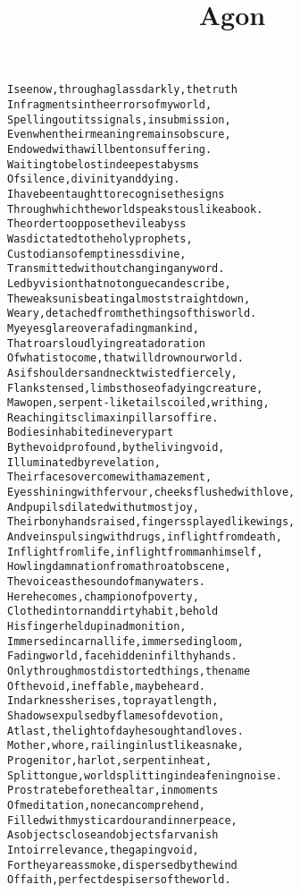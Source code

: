 \documentclass{article}
\title{Agon}
\begin{document}
\maketitle

\clearpage

\begin{alltt}\normalfont
I see now, through a glass darkly, the truth
In fragments in the errors of my world,
Spelling out its signals, in submission,
Even when their meaning remains obscure,
Endowed with a will bent on suffering.
Waiting to be lost in deepest abysms
Of silence, divinity and dying.
I have been taught to recognise the signs
Through which the world speaks to us like a book.
The order to oppose the vile abyss
Was dictated to the holy prophets,
Custodians of emptiness divine,
Transmitted without changing any word.
Led by vision that no tongue can describe,
The weak sun is beating almost straight down,
Weary, detached from the things of this world.
My eyes glare over a fading mankind,
That roars loudly in great adoration
Of what is to come, that will drown our world.
As if shoulders and neck twisted fiercely,
Flanks tensed, limbs those of a dying creature,
Maw open, serpent-like tails coiled, writhing,
Reaching its climax in pillars of fire.
Bodies inhabited in every part
By the void profound, by the living void,
Illuminated by revelation,
Their faces overcome with amazement,
Eyes shining with fervour, cheeks flushed with love,
And pupils dilated with utmost joy,
Their bony hands raised, fingers splayed like wings,
And veins pulsing with drugs, in flight from death,
In flight from life, in flight from man himself,
Howling damnation from a throat obscene,
The voice as the sound of many waters.
Here he comes, champion of poverty,
Clothed in torn and dirty habit, behold
His finger held up in admonition,
Immersed in carnal life, immersed in gloom,
Fading world, face hidden in filthy hands.
Only through most distorted things, the name
Of the void, ineffable, may be heard.
In darkness he rises, to pray at length,
Shadows expulsed by flames of devotion,
At last, the light of day he sought and loves.
Mother, whore, railing in lust like a snake,
Progenitor, harlot, serpent in heat,
Split tongue, world splitting in deafening noise.
Prostrate before the altar, in moments
Of meditation, none can comprehend,
Filled with mystic ardour and inner peace,
As objects close and objects far vanish
Into irrelevance, the gaping void,
For they are as smoke, dispersed by the wind
Of faith, perfect despisers of the world.
\end{alltt}
\end{document}

